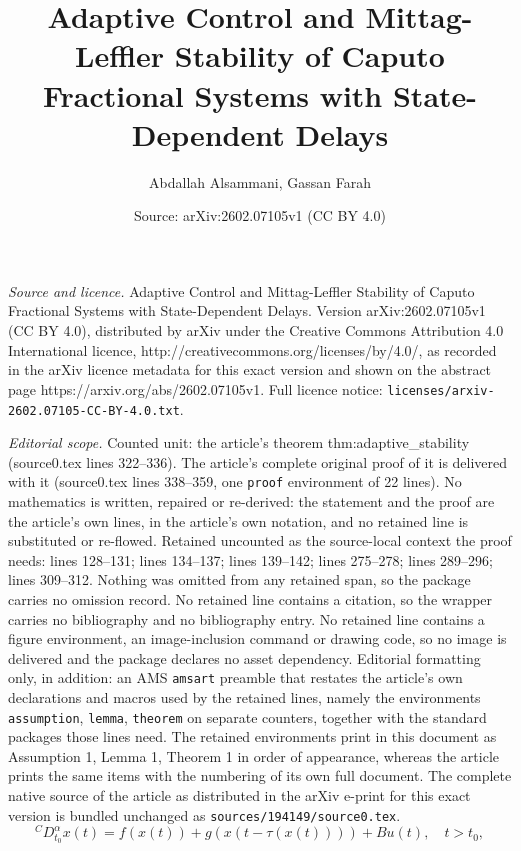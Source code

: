 \documentclass[10pt,a4paper]{amsart}
\title{\Large Adaptive Control and Mittag-Leffler Stability of Caputo Fractional Systems with State-Dependent Delays}
\author{Abdallah Alsammani, Gassan Farah}
\date{Source: arXiv:2602.07105v1 (CC BY 4.0)}
\begin{document}
\maketitle

\noindent\emph{Source and licence.} \Large Adaptive Control and Mittag-Leffler Stability of Caputo Fractional Systems with State-Dependent Delays. Version arXiv:2602.07105v1 (CC BY 4.0), distributed by arXiv under the Creative Commons Attribution 4.0 International licence, http://creativecommons.org/licenses/by/4.0/, as recorded in the arXiv licence metadata for this exact version and shown on the abstract page https://arxiv.org/abs/2602.07105v1. Full licence notice: \texttt{licenses/arxiv-2602.07105-CC-BY-4.0.txt}.\par\smallskip

\noindent\textit{Editorial scope.} Counted unit: the article's theorem thm:adaptive\_stability (source0.tex lines 322--336). The article's complete original proof of it is delivered with it (source0.tex lines 338--359, one \texttt{proof} environment of 22 lines). No mathematics is written, repaired or re-derived: the statement and the proof are the article's own lines, in the article's own notation, and no retained line is substituted or re-flowed.  Retained uncounted as the source-local context the proof needs: lines 128--131; lines 134--137; lines 139--142; lines 275--278; lines 289--296; lines 309--312.  Nothing was omitted from any retained span, so the package carries no omission record.  No retained line contains a citation, so the wrapper carries no bibliography and no bibliography entry.  No retained line contains a figure environment, an image-inclusion command or drawing code, so no image is delivered and the package declares no asset dependency.  Editorial formatting only, in addition: an AMS \texttt{amsart} preamble that restates the article's own declarations and macros used by the retained lines, namely the environments \texttt{assumption}, \texttt{lemma}, \texttt{theorem} on separate counters, together with the standard packages those lines need.  The retained environments print in this document as Assumption 1, Lemma 1, Theorem 1 in order of appearance, whereas the article prints the same items with the numbering of its own full document.  The complete native source of the article as distributed in the arXiv e-print for this exact version is bundled unchanged as \texttt{sources/194149/source0.tex}.
\begin{equation}
\label{eq:system}
    {}^{C}\!D^{\alpha}_{t_0} x(t) = f(x(t)) + g(x(t-\tau(x(t)))) + B u(t), \quad t > t_0,
\end{equation}
\end{document}
